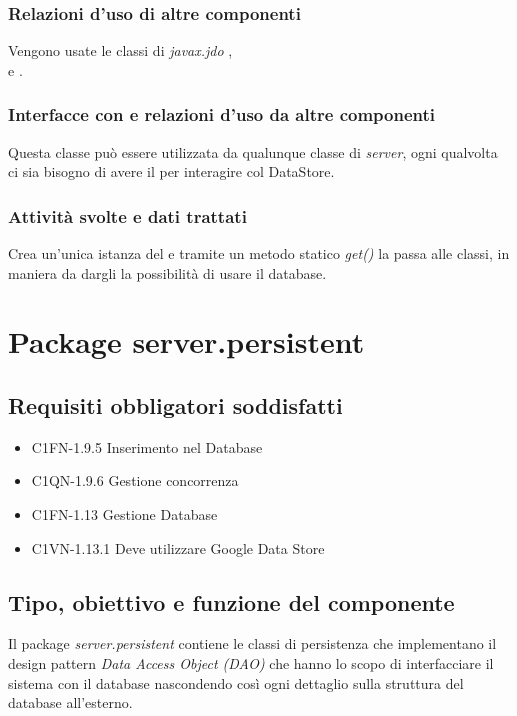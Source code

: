 \subsubsection*{Relazioni d'uso di altre componenti}
Vengono usate le classi di \emph{javax.jdo} ,
\\ e .

\subsubsection*{Interfacce con e relazioni d'uso da altre componenti}
Questa classe pu\`o essere utilizzata da qualunque classe di \emph{server}, ogni
qualvolta ci sia bisogno di avere il  per interagire col
DataStore.

\subsubsection*{Attivit\`a svolte e dati trattati}
Crea un'unica istanza del  e tramite un metodo
statico \emph{get()} la passa alle classi, in maniera da dargli la possibilit\`a
di usare il database.

\newpage
\section{Package server.persistent} %
\subsection*{Requisiti obbligatori soddisfatti}
\begin{itemize}
	\item C1FN-1.9.5 Inserimento nel Database
	\item C1QN-1.9.6 Gestione concorrenza
	\item C1FN-1.13 Gestione Database
	\item C1VN-1.13.1 Deve utilizzare Google Data Store
\end{itemize}
\subsection*{Tipo, obiettivo e funzione del componente}
Il package \emph{server.persistent} contiene le classi di persistenza che
implementano il design pattern \emph{Data Access Object (DAO)} che hanno lo
scopo di interfacciare il sistema con il database nascondendo cos\`i ogni
dettaglio sulla struttura del database all'esterno. 
